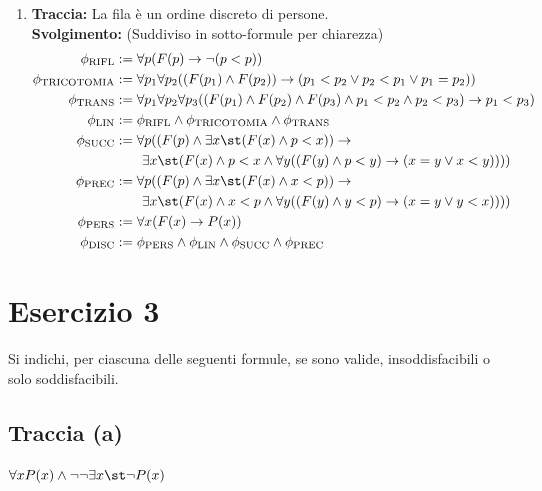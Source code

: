 \begin{enumerate}
    \item[(e)] \textbf{Traccia:} La fila è un ordine discreto di persone. \\
    \textbf{Svolgimento:} (Suddiviso in sotto-formule per chiarezza)
    \begin{align*}
        \phi_{\text{RIFL}} &:= \forall p (F(p) \rightarrow \neg(p<p)) \\
        \phi_{\text{TRICOTOMIA}} &:= \forall p_1 \forall p_2 ((F(p_1)\wedge F(p_2)) \rightarrow (p_1<p_2 \vee p_2<p_1 \vee p_1=p_2)) \\
        \phi_{\text{TRANS}} &:= \forall p_1 \forall p_2 \forall p_3 ((F(p_1)\wedge F(p_2)\wedge F(p_3) \wedge p_1<p_2 \wedge p_2<p_3) \rightarrow p_1<p_3) \\
        \phi_{\text{LIN}} &:= \phi_{\text{RIFL}} \wedge \phi_{\text{TRICOTOMIA}} \wedge \phi_{\text{TRANS}} \\
        \phi_{\text{SUCC}} &:= \forall p ((F(p) \wedge \exists x \st (F(x) \wedge p<x)) \rightarrow \\
        & \qquad \exists x \st (F(x) \wedge p<x \wedge \forall y ((F(y) \wedge p<y) \rightarrow (x=y \vee x<y)))) \\
        \phi_{\text{PREC}} &:= \forall p ((F(p) \wedge \exists x \st (F(x) \wedge x<p)) \rightarrow \\
        & \qquad \exists x \st (F(x) \wedge x<p \wedge \forall y ((F(y) \wedge y<p) \rightarrow (x=y \vee y<x)))) \\
        \phi_{\text{PERS}} &:= \forall x (F(x) \rightarrow P(x)) \\
        \phi_{\text{DISC}} &:= \phi_{\text{PERS}} \wedge \phi_{\text{LIN}} \wedge \phi_{\text{SUCC}} \wedge \phi_{\text{PREC}}
    \end{align*}
\end{enumerate}

\vspace{1cm}

\section*{Esercizio 3}
Si indichi, per ciascuna delle seguenti formule, se sono valide, insoddisfacibili o solo soddisfacibili.

\subsection*{Traccia (a)}
\(\forall x P(x)\wedge\neg\neg\exists x \st \neg P(x)\)

